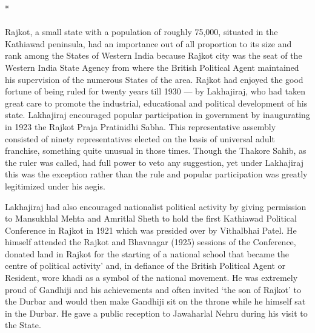 \begin{multicols}{2}
\begin{center}*\end{center}

\paragraph*{}

Rajkot, a small state with a population of roughly 75,000, situated in the Kathiawad peninsula, had an importance out of all proportion to its size and rank among the States of Western India because Rajkot city was the seat of the Western India State Agency from where the British Political Agent maintained his supervision of the numerous States of the area. Rajkot had enjoyed the good fortune of being ruled for twenty years till 1930 --- by Lakhajiraj, who had taken great care to promote the industrial, educational and political development of his state. Lakhajiraj encouraged popular participation in government by inaugurating in 1923 the Rajkot Praja Pratinidhi Sabha. This representative assembly consisted of ninety representatives elected on the basis of universal adult franchise, something quite unusual in those times. Though the Thakore Sahib, as the ruler was called, had full power to veto any suggestion, yet under Lakhajiraj this was the exception rather than the rule and popular participation was greatly legitimized under his aegis. 

Lakhajiraj had also encouraged nationalist political activity by giving permission to Mansukhlal Mehta and Amritlal Sheth to hold the first Kathiawad Political Conference in Rajkot in 1921 which was presided over by Vithalbhai Patel. He himself attended the Rajkot and Bhavnagar (1925) sessions of the Conference, donated land in Rajkot for the starting of a national school that became the centre of political activity' and, in defiance of the British Political Agent or Resident, wore khadi as a symbol of the national movement. He was extremely proud of Gandhiji and his achievements and often invited `the son of Rajkot' to the Durbar and would then make Gandhiji sit on the throne while he himself sat in the Durbar. He gave a public reception to Jawaharlal Nehru during his visit to the State. 


\end{multicols}
